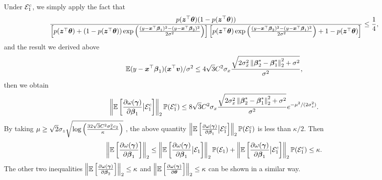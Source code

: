Under ${\cal E}_1^c$, we simply apply the fact that 
\[\frac{p(\boldsymbol{z}^\top\boldsymbol{\theta})(1-p(\boldsymbol{z}^\top\boldsymbol{\theta}))}{\left[p(\boldsymbol{z}^\top\boldsymbol{\theta})+(1-p(\boldsymbol{z}^\top\boldsymbol{\theta}))\exp\left(\frac{(y-\boldsymbol{x}^{\top}\boldsymbol{\beta}_1)^2-(y-\boldsymbol{x}^{\top}\boldsymbol{\beta}_2)^2}{2\sigma^2}\right)\right]\left[p(\boldsymbol{z}^\top\boldsymbol{\theta})\exp\left(\frac{(y-\boldsymbol{x}^{\top}\boldsymbol{\beta}_2)^2-(y-\boldsymbol{x}^{\top}\boldsymbol{\beta}_1)^2}{2\sigma^2}\right)+1-p(\boldsymbol{z}^\top\boldsymbol{\theta})\right]} \leq \frac{1}{4},\]
and the result we derived above
\[\mathbb{E} (y-\boldsymbol{x}^\top\boldsymbol{\beta}_1)(\boldsymbol{x}^{\top}\boldsymbol{v})/\sigma^2 \leq 4\sqrt{3}C^2\sigma_x\frac{\sqrt{2\sigma_x^2\left\lVert\boldsymbol{\beta}^*_2-\boldsymbol{\beta}^*_1\right\rVert_2^2+\sigma^2}}{\sigma^2},\]
then we obtain
\[\left\lVert\mathbb{E}\left[\frac{\partial\omega(\boldsymbol{\gamma})}{\partial \boldsymbol{\beta}_1} \big| {\cal E}_1^c \right]\right\rVert_2\mathbb{P}({\cal E}_1^c) \leq 8\sqrt{3}C^2\sigma_x\frac{\sqrt{2\sigma_x^2\left\lVert\boldsymbol{\beta}^*_2-\boldsymbol{\beta}^*_1\right\rVert_2^2+\sigma^2}}{\sigma^2} e^{-\mu^2/(2\sigma_z^2)}.\]
By taking $\mu \geq  \sqrt{2}\sigma_z\sqrt{\log\left( \frac{32\sqrt{3}C^2\sigma_x^2c_2}{\kappa} \right)}$ , the above quantity $\left\lVert\mathbb{E}\left[\frac{\partial\omega(\boldsymbol{\gamma})}{\partial \boldsymbol{\beta}_1} \big| {\cal E}_1^c \right]\right\rVert_2\mathbb{P}({\cal E}_1^c)$ is less than $\kappa/2$.
Then
\[\left\lVert\mathbb{E}\left[\frac{\partial\omega(\boldsymbol{\gamma})}{\partial \boldsymbol{\beta}_1} \right]\right\rVert_2 \leq  \left\lVert\mathbb{E}\left[\frac{\partial\omega(\boldsymbol{\gamma})}{\partial \boldsymbol{\beta}_1} \big| {\cal E}_1\right]\right\rVert_2\mathbb{P}({\cal E}_1) + \left\lVert\mathbb{E}\left[\frac{\partial\omega(\boldsymbol{\gamma})}{\partial \boldsymbol{\beta}_1} \big| {\cal E}_1^c \right]\right\rVert_2\mathbb{P}({\cal E}_1^c) \leq \kappa.\]
The other two inequalities $\left\lVert\mathbb{E}\left[\frac{\partial\omega(\boldsymbol{\gamma})}{\partial \boldsymbol{\beta}_2}\right]\right\rVert_2 \leq \kappa$ and $\left\lVert\mathbb{E}\left[\frac{\partial\omega(\boldsymbol{\gamma})}{\partial \boldsymbol{\theta}}\right]\right\rVert_2 \leq \kappa$ can be shown in a similar way. 

